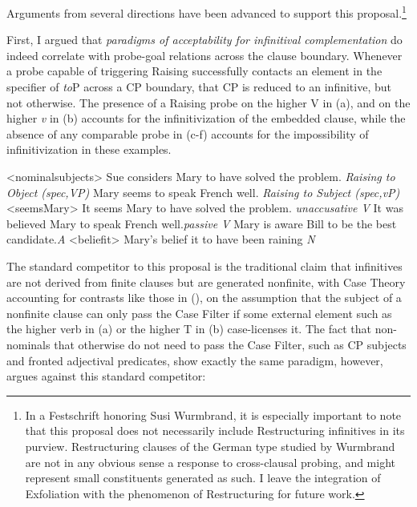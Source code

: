 \documentclass[output=paper]{langscibook}
\begin{document}
\noindent Arguments from several directions have been advanced to support this proposal.\footnote{In a Festschrift honoring Susi Wurmbrand, it is especially important to note that this proposal does not necessarily include Restructuring infinitives in its purview. Restructuring clauses of the German type studied by Wurmbrand are not in any obvious sense a response to cross-clausal probing, and might represent small constituents generated as such. I leave the integration of Exfoliation with the phenomenon of Restructuring for future work.} 

First, I argued that \textit{paradigms of acceptability for infinitival complementation} do indeed correlate with probe-goal relations across the clause boundary. Whenever a probe capable of triggering Raising successfully contacts an element in the specifier of \textit{to}P across a CP boundary, that CP is reduced to an infinitive, but not otherwise. The presence of a Raising probe on the higher V in (a), and on the higher \textit{v }in (b) accounts for the infinitivization of the embedded clause, while the absence of any comparable probe in (c-f) accounts for the impossibility of infinitivization in these examples.

\pex<nominalsubjects> 
\a Sue considers Mary to have solved the problem. \tab\emph{\footnotesize{Raising to Object (spec,VP)}}
\a Mary seems to speak French well. \tab\tab \emph{\footnotesize{Raising to Subject (spec,\textit{v}P)}}
\a<seemsMary> \ljudge*It seems Mary to have solved the problem. \tab\emph{\footnotesize{unaccusative V}}
\a \ljudge*It was believed Mary to speak French well.\tab \emph{\footnotesize{passive V}}
\a \ljudge*Mary is aware Bill to be the best candidate.\tab \emph{\footnotesize{A}}
\a<beliefit> \ljudge*Mary's belief it to have been raining \tab  \tab\emph{\footnotesize{N}}
\xe

\noindent The standard competitor to this proposal is the traditional claim that infinitives are not derived from finite clauses but are generated nonfinite, with Case Theory accounting for contrasts like those in (), on the assumption that the subject of a nonfinite clause can only pass the Case Filter if some external element such as the higher verb in \noindent (a) or the higher T in \noindent (b) case-licenses it. The fact that non-nominals that otherwise do not need to pass the Case Filter, such as CP subjects and fronted adjectival predicates, show exactly the same paradigm, however, argues against this standard competitor:
\end{document}
